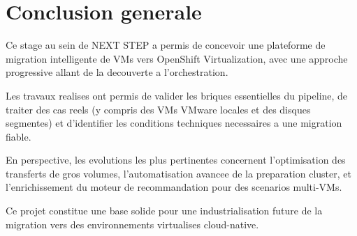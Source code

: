 ﻿\chapter*{Conclusion generale}

Ce stage au sein de NEXT STEP a permis de concevoir une plateforme de migration intelligente de VMs vers OpenShift Virtualization, avec une approche progressive allant de la decouverte a l'orchestration.

Les travaux realises ont permis de valider les briques essentielles du pipeline, de traiter des cas reels (y compris des VMs VMware locales et des disques segmentes) et d'identifier les conditions techniques necessaires a une migration fiable.

En perspective, les evolutions les plus pertinentes concernent l'optimisation des transferts de gros volumes, l'automatisation avancee de la preparation cluster, et l'enrichissement du moteur de recommandation pour des scenarios multi-VMs.

Ce projet constitue une base solide pour une industrialisation future de la migration vers des environnements virtualises cloud-native.
